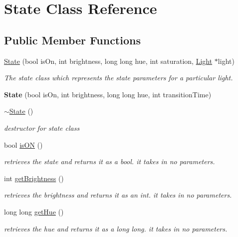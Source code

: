 \hypertarget{class_state}{}\section{State Class Reference}
\label{class_state}
\subsection*{Public Member Functions}
\begin{DoxyCompactItemize}
\item 
\hyperlink{class_state_a5e37ff8935f49ac28c0d0faeae304c8e}{State} (bool is\+On, int brightness, long long hue, int saturation, \hyperlink{class_light}{Light} $\ast$light)
\begin{DoxyCompactList}\small\item\em The state class which represents the state parameters for a particular light. \end{DoxyCompactList}\item 
\mbox{\label{class_state_a6e4386b06561162eae88727c1726d631}} 
{\bfseries State} (bool is\+On, int brightness, long long hue, int transition\+Time)
\item 
\hyperlink{class_state_afab438d92b90dc18d194dbd9c9c8bab3}{$\sim$\+State} ()
\begin{DoxyCompactList}\small\item\em destructor for state class \end{DoxyCompactList}\item 
bool \hyperlink{class_state_a51fd7ff4c5635fc399646af9d2d87aa9}{is\+ON} ()
\begin{DoxyCompactList}\small\item\em retrieves the state and returns it as a bool. it takes in no parameters. \end{DoxyCompactList}\item 
int \hyperlink{class_state_a1d41660b888020ca18e15ba21549524c}{get\+Brightness} ()
\begin{DoxyCompactList}\small\item\em retrieves the brightness and returns it as an int. it takes in no parameters. \end{DoxyCompactList}\item 
long long \hyperlink{class_state_a8f92126bdf14a5c0109e041f29747366}{get\+Hue} ()
\begin{DoxyCompactList}\small\item\em retrieves the hue and returns it as a long long. it takes in no parameters. \end{DoxyCompactList}\item 

\end{DoxyCompactItemize}
